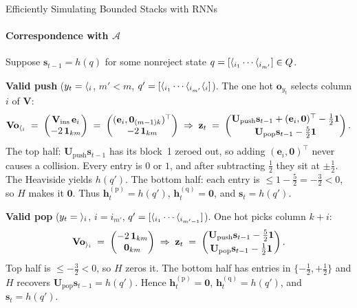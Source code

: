 \begin{question}{Efficiently Simulating Bounded Stacks with RNNs}
\begin{subquestion}
    \paragraph{Correspondence with $\mathcal{A}$} Suppose $\mathbf{s}_{t-1} = h(q)$ for some nonreject state $q = [\openBr{i_1}\cdots\openBr{i_{m'}}] \in \states$.
    
    
    \textbf{Valid push} ($y_t = \openBr{i}$, $m' < m$, $q' = [\openBr{i_1}\cdots\openBr{i_{m'}}\openBr{i}]$). 
    The one hot $\mathbf{o}_{y_t}$ selects column $i$ of $\mathbf{V}$:
    \[
        \mathbf{V}\mathbf{o}_{\openBr{i}} \;=\; \begin{pmatrix} \mathbf{V}_{\text{ins}}\,\mathbf{e}_i \\ -2\,\mathbf{1}_{km} \end{pmatrix} \;=\; \begin{pmatrix} (\mathbf{e}_i, \mathbf{0}_{(m-1)k})^\top \\ -2\,\mathbf{1}_{km} \end{pmatrix} \;\Rightarrow\; \mathbf{z}_t \;=\; \begin{pmatrix} \mathbf{U}_{\text{push}}\mathbf{s}_{t-1} + (\mathbf{e}_i, \mathbf{0})^\top - \tfrac{1}{2}\mathbf{1} \\[2pt] \mathbf{U}_{\text{pop}}\mathbf{s}_{t-1} - \tfrac{5}{2}\mathbf{1} \end{pmatrix}.
    \]
    The top half: $\mathbf{U}_{\text{push}}\mathbf{s}_{t-1}$ has its block~1 zeroed out, so adding $(\mathbf{e}_i, \mathbf{0})^\top$ never causes a collision.
    Every entry is $0$ or $1$, and after subtracting $\tfrac{1}{2}$ they sit at $\pm\tfrac{1}{2}$. 
    The Heaviside yields $h(q')$. 
    The bottom half: each entry is $\le 1 - \tfrac{5}{2} = -\tfrac{3}{2} < 0$, so $H$ makes it $\mathbf{0}$. 
    Thus $\mathbf{h}_t^{(\text{p})} = h(q')$, $\mathbf{h}_t^{(\text{q})} = \mathbf{0}$, and $\mathbf{s}_t = h(q')$.
    
    
    \textbf{Valid pop} ($y_t = \closeBr{i}$, $i = i_{m'}$, $q' = [\openBr{i_1}\cdots\openBr{i_{m'-1}}]$). 
    One hot picks column $k+i$:
    \[
        \mathbf{V}\mathbf{o}_{\closeBr{i}} \;=\; \begin{pmatrix} -2\,\mathbf{1}_{km} \\ \mathbf{0}_{km} \end{pmatrix} \;\Rightarrow\; \mathbf{z}_t \;=\; \begin{pmatrix} \mathbf{U}_{\text{push}}\mathbf{s}_{t-1} - \tfrac{5}{2}\mathbf{1} \\[2pt] \mathbf{U}_{\text{pop}}\mathbf{s}_{t-1} - \tfrac{1}{2}\mathbf{1} \end{pmatrix}.
    \]
    Top half is $\le -\tfrac{3}{2} < 0$, so $H$ zeros it. 
    The bottom half has entries in $\{-\tfrac{1}{2}, +\tfrac{1}{2}\}$ and $H$ recovers $\mathbf{U}_{\text{pop}}\mathbf{s}_{t-1} = h(q')$. 
    Hence $\mathbf{h}_t^{(\text{p})} = \mathbf{0}$, $\mathbf{h}_t^{(\text{q})} = h(q')$, and $\mathbf{s}_t = h(q')$.
    

\end{subquestion}
\end{question}
